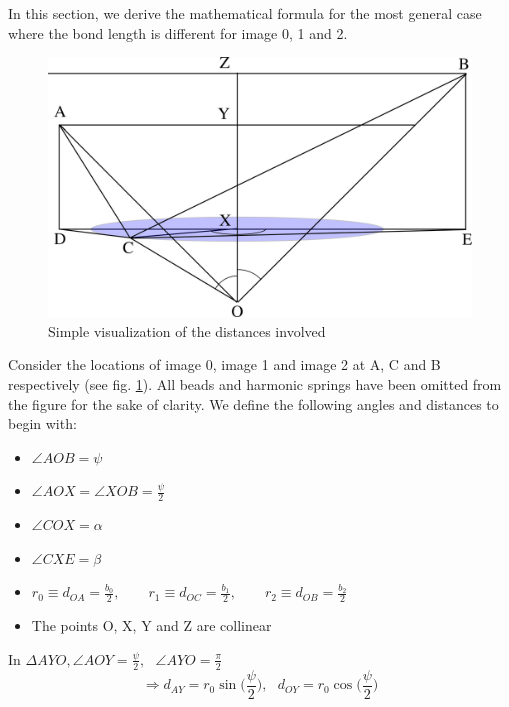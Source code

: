 \label{Appendix A}
    In this section, we derive the mathematical formula for the most general case where the bond length is different for image 0, 1 and 2.
    \begin{figure}[!htbp]
        \centering
        \includegraphics[scale=1.5,keepaspectratio]{Appendix-A/Figures/differentBondlength.png}
        \caption{Simple visualization of the distances involved}
        \label{fig:dist}
    \end{figure}
    Consider the locations of image 0, image 1 and image 2 at A, C and B respectively (see fig. \ref{fig:dist}). All beads and harmonic springs have been omitted from the figure for the sake of clarity. We define the following angles and distances to begin with:
    \begin{itemize}
        \item $\angle AOB = \psi$
        \item $\angle AOX = \angle XOB = \displaystyle\frac{\psi}{2}$
        \item $\angle COX = \alpha$
        \item $\angle CXE = \beta$
        \item $r_0 \equiv d_{OA} = \displaystyle\frac{b_0}{2} , \qquad r_1 \equiv d_{OC} = \frac{b_1}{2}, \qquad r_2 \equiv d_{OB} = \frac{b_2}{2}$
        \item The points O, X, Y and Z are collinear
    \end{itemize}

    In $\Delta AYO ,\angle AOY = \displaystyle\frac{\psi}{2}, \: \: \: \angle AYO = \frac{\pi}{2}$
    \begin{equation}
    \label{eq:ay}
        \Rightarrow d_{AY} = r_0  \sin \Big(\displaystyle\frac{\psi}{2}\Big), \: \: \: d_{OY} = r_0  \cos \Big(\displaystyle\frac{\psi}{2}\Big)
    \end{equation}

